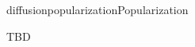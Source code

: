 \documentclass{ra2016}
\begin{document}
\begin{module}{diffusion}{popularization}{Popularization}

TBD 


\end{module}




\nocite{*}
\loadbiblio

\end{document}
